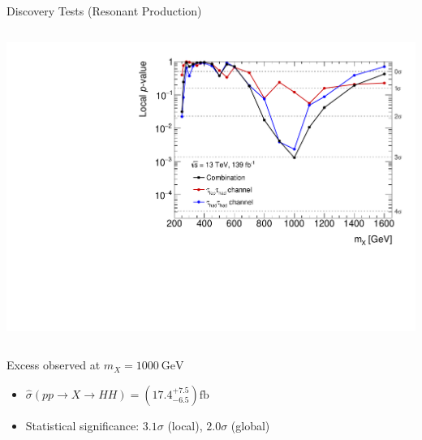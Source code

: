 \documentclass[11pt, xcolor={dvipsnames}, aspectratio=169, notes]{beamer}
\begin{document}
\begin{frame}{Discovery Tests (Resonant \allbold{\HH} Production)}
  \vspace*{0.5em}
  \begin{columns}[onlytextwidth, b]
    \centering

    \includegraphics[width=1.0\textwidth, trim=0 0.3em 0 1em]{results_res/resonant_comb_pvalues}

    \centering

  \end{columns}

  \vspace*{-0.1em}

  Excess observed at $m_{X} = \SI{1000}{\GeV}$\\[0.4em]
  \begin{itemize}
    \setlength{\itemsep}{0.4em}
  \item $\hat{\sigma}(pp \to X \to HH) = \left( 17.4^{+7.5}_{-6.5}
    \right)\si{\femto\barn}$
  \item Statistical significance: $3.1\sigma$ (local), $2.0\sigma$ (global)
  \end{itemize}


\end{frame}
\end{document}
